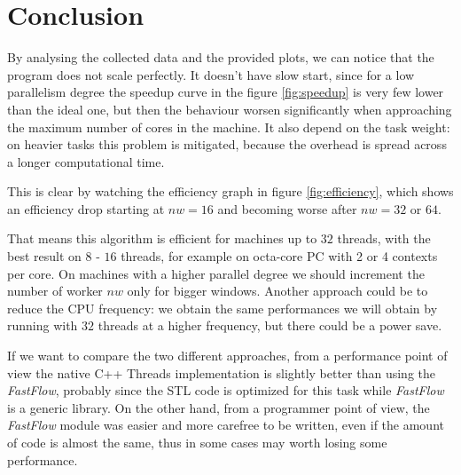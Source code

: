 \section{Conclusion}
By analysing the collected data and the provided plots, we can notice that the program does not scale perfectly. It doesn't have slow start, since for a low parallelism degree the speedup curve in the figure \ref{fig:speedup} is very few lower than the ideal one, but then the behaviour worsen significantly when approaching the maximum number of cores in the machine. It also depend on the task weight: on heavier tasks this problem is mitigated, because the overhead is spread across a longer computational time.

This is clear by watching the efficiency graph in figure \ref{fig:efficiency}, which shows an efficiency drop starting at $nw = 16$ and becoming worse after $nw = 32$ or $64$.

That means this algorithm is efficient for machines up to $32$ threads, with the best result on $8$ - $16$ threads, for example on octa-core PC with 2 or 4 contexts per core. On machines with a higher parallel degree we should increment the number of worker $nw$ only for bigger windows. Another approach could be to reduce the CPU frequency: we obtain the same performances we will obtain by running with $32$ threads at a higher frequency, but there could be a power save.

\bigskip\noindent
If we want to compare the two different approaches, from a performance point of view the native C++ Threads implementation is slightly better than using the \textit{FastFlow}, probably since the STL code is optimized for this task while \textit{FastFlow} is a generic library. On the other hand, from a programmer point of view, the \textit{FastFlow} module was easier and more carefree to be written, even if the amount of code is almost the same, thus in some cases may worth losing some performance.